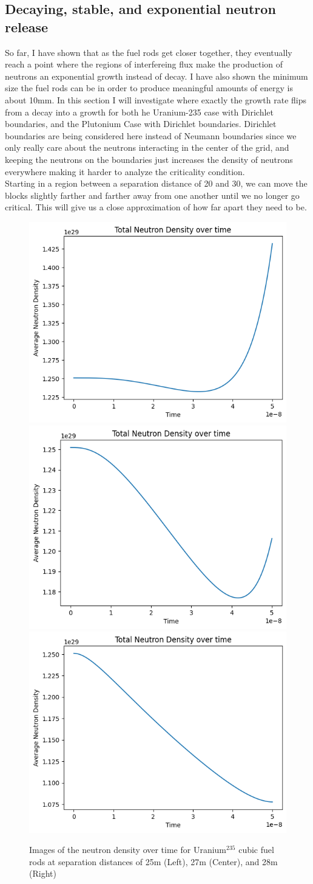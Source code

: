 \documentclass[letterpaper, 12pt]{article}
\begin{document}
      \subsection{Decaying, stable, and exponential neutron release}
         So far, I have shown that as the fuel rods get closer together, they eventually reach a point where the regions of interfereing flux make the production of neutrons an exponential growth instead of decay. I have also shown the minimum size the fuel rods can be in order to produce meaningful amounts of energy is about 10mm. In this section I will investigate where exactly the growth rate flips from a decay into a growth for both he Uranium-235 case with Dirichlet boundaries, and the Plutonium Case with Dirichlet boundaries. Dirichlet boundaries are being considered here instead of Neumann boundaries since we only really care about the neutrons interacting in the center of the grid, and keeping the neutrons on the boundaries just increases the density of neutrons everywhere making it harder to analyze the criticality condition.\\

         Starting in a region between a separation distance of 20 and 30, we can move the blocks slightly farther and farther away from one another until we no longer go critical. This will give us a close approximation of how far apart they need to be.

         \begin{figure}[h!]
            \centering
            \includegraphics[width=0.3\linewidth]{Graphs/Criticality-Test-U235-25m.png}
            \includegraphics[width=0.3\linewidth]{Graphs/Criticality-Test-U235-27m.png}
            \includegraphics[width=0.3\linewidth]{Graphs/Criticality-Test-U235-28m.png}
            \caption{Images of the neutron density over time for Uranium$^{235}$ cubic fuel rods at separation distances of 25m (Left), 27m (Center), and 28m (Right)}
            \label{img:Uranium-Criticality-Test}
         \end{figure}
\end{document}
